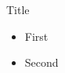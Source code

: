 \begin{frame}{Title}
\begin{center}
\begin{itemize}
\item<1->[A] First
\item Second
\end{itemize}
\end{center}
\end{frame}
